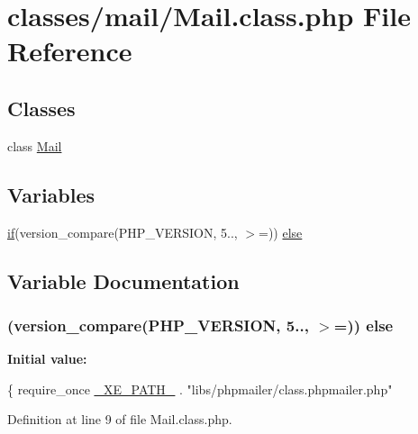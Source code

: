 \hypertarget{Mail_8class_8php}{}\section{classes/mail/\+Mail.class.\+php File Reference}
\label{Mail_8class_8php}
\subsection*{Classes}
\begin{DoxyCompactItemize}
\item 
class \hyperlink{classMail}{Mail}
\end{DoxyCompactItemize}
\subsection*{Variables}
\begin{DoxyCompactItemize}
\item 
\hyperlink{point__level__icon_8addon_8php_a29031816e50a8f742422e671b2bef9b2}{if}(version\+\_\+compare(P\+H\+P\+\_\+\+V\+E\+R\+S\+I\+O\+N, \textquotesingle{}5..\textquotesingle{}, \textquotesingle{}$>$=\textquotesingle{})) \hyperlink{Mail_8class_8php_ab13fcd53787fc51418153752d5962cda}{else}
\end{DoxyCompactItemize}


\subsection{Variable Documentation}
\hypertarget{Mail_8class_8php_ab13fcd53787fc51418153752d5962cda}{}
\subsubsection[{else}]{ (version\+\_\+compare(P\+H\+P\+\_\+\+V\+E\+R\+S\+I\+O\+N, \textquotesingle{}5..\textquotesingle{}, \textquotesingle{}$>$=\textquotesingle{})) else}\label{Mail_8class_8php_ab13fcd53787fc51418153752d5962cda}
{\bfseries Initial value\+:}
\begin{DoxyCode}
\{
    require\_once \hyperlink{config_8inc_8php_a5387c7a3f2aa38adf16f324cee88db88}{\_XE\_PATH\_} . \textcolor{stringliteral}{"libs/phpmailer/class.phpmailer.php"}
\end{DoxyCode}


Definition at line 9 of file Mail.\+class.\+php.

